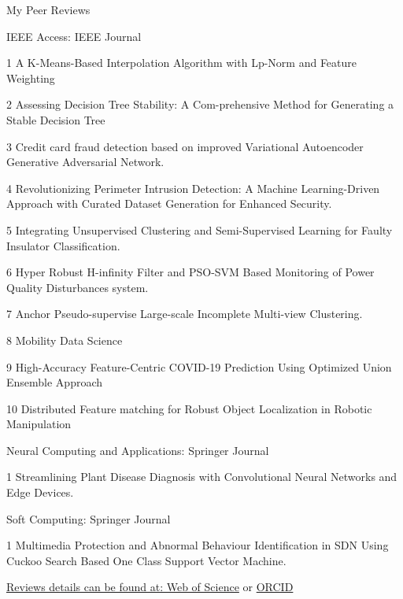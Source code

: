 \documentclass{resume} %
\begin{document}
\begin{rSection}{My Peer Reviews}
	
	\begin{rSubsection}{IEEE Access: IEEE Journal}{}{}{}	
		\item[1] A K-Means-Based Interpolation Algorithm with Lp-Norm and Feature Weighting
		\item[2] Assessing Decision Tree Stability: A Com-prehensive Method for Generating a Stable Decision Tree
		\item[3] Credit card fraud detection based on improved Variational Autoencoder Generative Adversarial Network.
		\item[4] Revolutionizing Perimeter Intrusion Detection: A Machine Learning-Driven Approach with Curated Dataset Generation for Enhanced Security.
		\item[5] Integrating Unsupervised Clustering and Semi-Supervised
		Learning for Faulty Insulator Classification.
		\item[6] Hyper Robust H-infinity Filter and PSO-SVM Based Monitoring of Power Quality Disturbances system.
		\item[7] Anchor Pseudo-supervise Large-scale Incomplete Multi-view Clustering.
		\item[8] Mobility Data Science
		\item[9] High-Accuracy Feature-Centric COVID-19 Prediction Using Optimized Union Ensemble Approach
		\item[10] Distributed Feature matching for Robust Object Localization in Robotic Manipulation
	\end{rSubsection}
	\begin{rSubsection}{Neural Computing and Applications: Springer Journal}{}{}{}		
		\item[1] Streamlining Plant Disease Diagnosis with Convolutional Neural Networks and Edge	Devices.
	\end{rSubsection}
	\begin{rSubsection}{Soft Computing: Springer Journal}{}{}{}		
		\item[1] Multimedia Protection and Abnormal Behaviour Identification in SDN Using Cuckoo Search Based One Class Support Vector Machine.
	\end{rSubsection}
	 \href{https://www.webofscience.com/wos/author/record/IUN-0908-2023}{Reviews details can be found at: Web of Science} or \href{https://orcid.org/0000-0001-8482-7678}{ ORCID}
\end{rSection}
\end{document}
